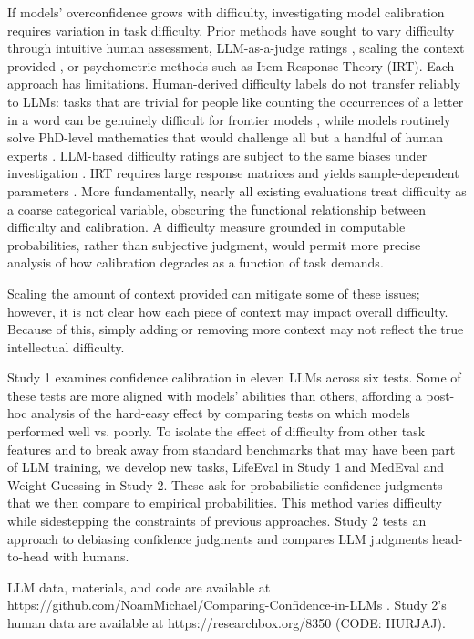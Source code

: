 \documentclass{article}
\begin{document}
If models' overconfidence grows with difficulty, investigating model calibration requires variation in task difficulty. Prior methods have sought to vary difficulty through intuitive human assessment, LLM-as-a-judge ratings \citep{CCRC, gobara2024llmsimplicitlydeterminesuitable}, scaling the context provided \citep{GRACE}, or psychometric methods such as Item Response Theory (IRT). Each approach has limitations. Human-derived difficulty labels do not transfer reliably to LLMs: tasks that are trivial for people like counting the occurrences of a letter in a word can be genuinely difficult for frontier models \citep{berry_good}, while models routinely solve PhD-level mathematics that would challenge all but a handful of human experts \citep{luong2025robustmathematicalreasoning}. LLM-based difficulty ratings are subject to the same biases under investigation \citep{tabib2025trustworthydifficultyassessmentslarge}. IRT requires large response matrices and yields sample-dependent parameters \citep{Attali_2020}. More fundamentally, nearly all existing evaluations treat difficulty as a coarse categorical variable, obscuring the functional relationship between difficulty and calibration. A difficulty measure grounded in computable probabilities, rather than subjective judgment, would permit more precise analysis of how calibration degrades as a function of task demands.

Scaling the amount of context provided can mitigate some of these issues; however, it is not clear how each piece of context may impact overall difficulty. Because of this, simply adding or removing more context may not reflect the true intellectual difficulty.

Study 1 examines confidence calibration in eleven LLMs across six tests. Some of these tests are more aligned with models' abilities than others, affording a post-hoc analysis of the hard-easy effect by comparing tests on which models performed well vs. poorly. To isolate the effect of difficulty from other task features and to break away from standard benchmarks that may have been part of LLM training, we develop new tasks, LifeEval in Study 1 and MedEval and Weight Guessing in Study 2. These ask for probabilistic confidence judgments that we then compare to empirical probabilities. This method varies difficulty while sidestepping the constraints of previous approaches. Study 2 tests an approach to debiasing confidence judgments and compares LLM judgments head-to-head with humans.  

LLM data, materials, and code are available at https://github.com/NoamMichael/Comparing-Confidence-in-LLMs . Study 2's human data are available at https://researchbox.org/8350 (CODE: HURJAJ).
\end{document}
